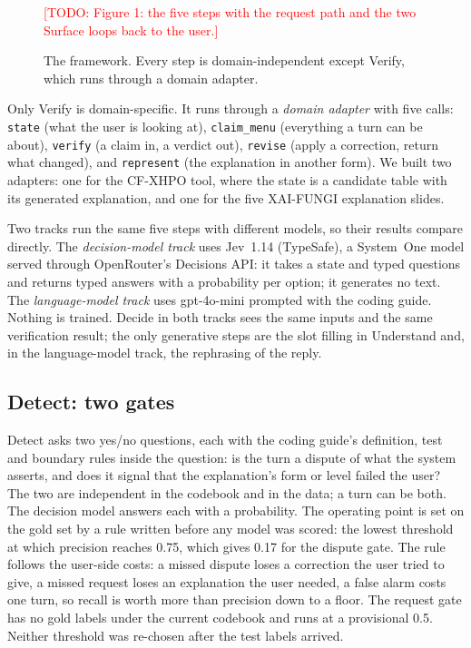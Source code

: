 \documentclass[preprint,12pt,3p,times]{elsarticle}
\newcommand{\todo}[1]{\textcolor{red}{[TODO: #1]}}
\begin{document}
\begin{figure}[t]
\centering
\todo{Figure 1: the five steps with the request path and the two Surface loops back to the user.}
\caption{The framework. Every step is domain-independent except Verify, which runs through a domain adapter.}
\label{fig:framework}
\end{figure}

Only Verify is domain-specific. It runs through a \emph{domain adapter} with five calls: \texttt{state} (what the user is looking at), \texttt{claim\_menu} (everything a turn can be about), \texttt{verify} (a claim in, a verdict out), \texttt{revise} (apply a correction, return what changed), and \texttt{represent} (the explanation in another form). We built two adapters: one for the CF-XHPO tool, where the state is a candidate table with its generated explanation, and one for the five XAI-FUNGI explanation slides.

Two tracks run the same five steps with different models, so their results compare directly. The \emph{decision-model track} uses Jev~1.14 (TypeSafe), a System~One model served through OpenRouter's Decisions API: it takes a state and typed questions and returns typed answers with a probability per option; it generates no text. The \emph{language-model track} uses gpt-4o-mini prompted with the coding guide. Nothing is trained. Decide in both tracks sees the same inputs and the same verification result; the only generative steps are the slot filling in Understand and, in the language-model track, the rephrasing of the reply.

\subsection{Detect: two gates}
\label{sec:detect}

Detect asks two yes/no questions, each with the coding guide's definition, test and boundary rules inside the question: is the turn a dispute of what the system asserts, and does it signal that the explanation's form or level failed the user? The two are independent in the codebook and in the data; a turn can be both. The decision model answers each with a probability. The operating point is set on the gold set by a rule written before any model was scored: the lowest threshold at which precision reaches 0.75, which gives 0.17 for the dispute gate. The rule follows the user-side costs: a missed dispute loses a correction the user tried to give, a missed request loses an explanation the user needed, a false alarm costs one turn, so recall is worth more than precision down to a floor. The request gate has no gold labels under the current codebook and runs at a provisional 0.5. Neither threshold was re-chosen after the test labels arrived.
\end{document}
